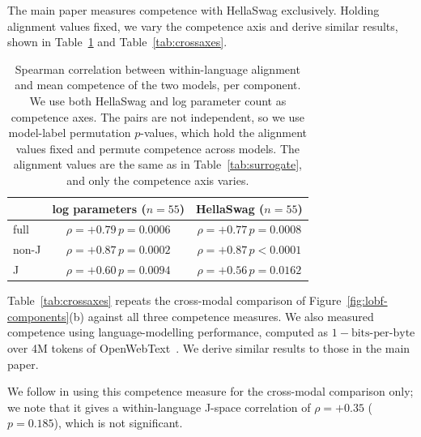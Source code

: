 \documentclass{article}
\begin{document}
The main paper measures competence with HellaSwag exclusively. Holding alignment values fixed, we vary the competence axis and derive similar results, shown in Table~\ref{tab:competence} and Table~\ref{tab:crossaxes}.

\begin{table}[h]
  \centering
  \small
  \caption{Spearman correlation between within-language alignment and mean competence of the two models, per component. We use both HellaSwag and log parameter count as competence axes. The pairs are not independent, so we use model-label permutation $p$-values, which hold the alignment values fixed and permute competence across models. The alignment
    values are the same as in Table~\ref{tab:surrogate}, and only the competence axis varies.}
  \label{tab:competence}
  \begin{tabular}{lcc}
    \toprule
         & log parameters ($n=55$)              & HellaSwag ($n=55$)                   \\
    \midrule
    full & $\rho = +0.79$\,{\tiny$p = 0.0006$} & $\rho = +0.77$\,{\tiny$p = 0.0008$} \\
    non-J & $\rho = +0.87$\,{\tiny$p = 0.0002$} & $\rho = +0.87$\,{\tiny$p < 0.0001$} \\
    J    & $\rho = +0.60$\,{\tiny$p = 0.0094$} & $\rho = +0.56$\,{\tiny$p = 0.0162$} \\
    \bottomrule
  \end{tabular}
\end{table}

Table~\ref{tab:crossaxes} repeats the cross-modal comparison of
Figure~\ref{fig:lobf-components}(b) against all three competence measures. We
also measured competence using language-modelling performance, computed as
$1 - \mathrm{bits\text{-}per\text{-}byte}$ over 4M tokens of
OpenWebText~\citep{openwebtext}. We derive similar results to those in the main paper.

We follow \citet{huh2024platonic} in using this competence measure for the cross-modal comparison only; we note that it gives a within-language J-space correlation of $\rho = +0.35$ ($p = 0.185$), which is not significant.
\end{document}
